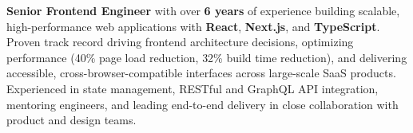 

\begin{cvparagraph}

    \textbf{Senior Frontend Engineer} with over \textbf{6 years} of experience building scalable, high-performance web applications with \textbf{React}, \textbf{Next.js}, and \textbf{TypeScript}. Proven track record driving frontend architecture decisions, optimizing performance (40\% page load reduction, 32\% build time reduction), and delivering accessible, cross-browser-compatible interfaces across large-scale SaaS products. Experienced in state management, RESTful and GraphQL API integration, mentoring engineers, and leading end-to-end delivery in close collaboration with product and design teams.
\end{cvparagraph}
